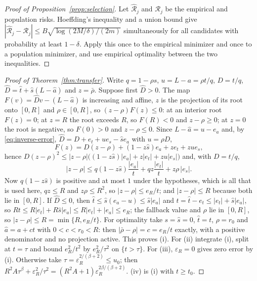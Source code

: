 \begin{proof}[Proof of Proposition~\ref{prop:selection}]
Let $\widehat{\mathcal R}_j$ and $\mathcal R_j$ be the empirical and population risks.
Hoeffding's inequality \cite{hoeffding} and a union bound give
$|\widehat{\mathcal R}_j-\mathcal R_j|\le
B\sqrt{\log(2M/\delta)/(2m)}$ simultaneously for all candidates with probability at least
$1-\delta$. Apply this once to the empirical minimizer and once to a population minimizer,
and use empirical optimality between the two inequalities.
\end{proof}

\begin{proof}[Proof of Theorem~\ref{thm:transfer}]
Write $q=1-\rho s$, $u=L-a=\rho t/q$, $D=t/q$, $\widehat D=\widehat t+\widehat s(L-\widehat a)$ and $z=\bar\rho$.
Suppose first $\widehat D>0$. The map $F(v)=\widehat Dv-(L-\widehat a)$ is increasing and affine, $z$ is the
projection of its root onto $[0,R]$ and $\rho\in[0,R]$, so $(z-\rho)F(z)\le0$: at an interior root $F(z)=0$; at
$z=R$ the root exceeds $R$, so $F(R)<0$ and $z-\rho\ge0$; at $z=0$ the root is negative, so $F(0)>0$ and
$z-\rho\le0$. Since $L-\widehat a=u-e_a$ and, by \eqref{eq:inverse-error},
$\widehat D=D+e_t+ue_s-\widehat se_a$ with $u=\rho D$,
\[
F(z)=D(z-\rho)+(1-z\widehat s)e_a+ze_t+zue_s ,
\]
hence $D(z-\rho)^2\le|z-\rho|\bigl((1-z\widehat s)|e_a|+z|e_t|+zu|e_s|\bigr)$ and, with $D=t/q$,
\[
|z-\rho|\le q(1-z\widehat s)\frac{|e_a|}{t}+qz\frac{|e_t|}{t}+z\rho\,|e_s| .
\]
Now $q(1-z\widehat s)$ is positive and at most $1$ under the hypotheses, which is all that is used here,
$qz\le R$ and $z\rho\le R^2$, so $|z-\rho|\le e_R/t$; and $|z-\rho|\le R$
because both lie in $[0,R]$. If $\widehat D\le0$, then $\widehat t\le\widehat s(e_a-u)\le\widehat s|e_a|$ and
$t=\widehat t-e_t\le|e_t|+\widehat s|e_a|$, so $Rt\le R|e_t|+R\widehat s|e_a|\le R|e_t|+|e_a|\le e_R$; the fallback
value and $\rho$ lie in $[0,R]$, so $|z-\rho|\le R=\min\{R,e_R/t\}$. For optimality take $s=\widehat s=0$,
$\widehat t=t$, $\rho=r_0$ and $\widehat a=a+ct$ with $0<c<r_0<R$: then $|\bar\rho-\rho|=c=e_R/t$ exactly, with a
positive denominator and no projection active. This proves (i). For (ii) integrate (i), split at $t=\tau$ and bound
$e_R^2/t^2$ by $e_R^2/\tau^2$ on $\{t>\tau\}$. For (iii), $\varepsilon_R=0$ gives zero error by (i). Otherwise take $\tau=\varepsilon_R^{2/(\beta+2)}\le u_0$; then
$R^2A\tau^\beta+\varepsilon_R^2/\tau^2=(R^2A+1)\varepsilon_R^{2\beta/(\beta+2)}$. (iv) is (i) with $t\ge t_0$.
\end{proof}

